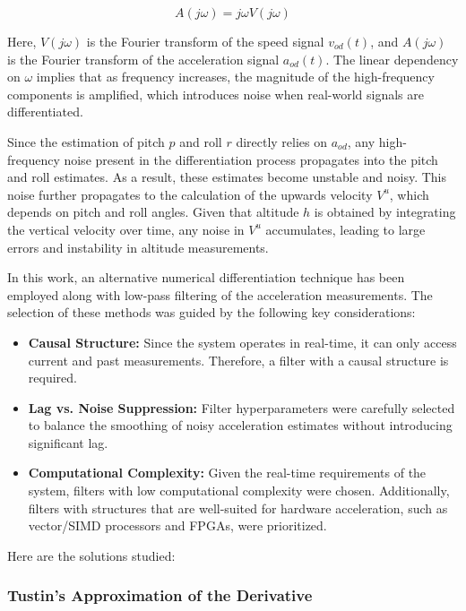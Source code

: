 \documentclass[conference]{IEEEtran}
\begin{document}
\[
A(j\omega) = j\omega V(j\omega)
\]

Here, \( V(j\omega) \) is the Fourier transform of the speed signal \( v_{od}(t) \), and \( A(j\omega) \) is the Fourier transform of the acceleration signal \( a_{od}(t) \). The linear dependency on \( \omega \) implies that as frequency increases, the magnitude of the high-frequency components is amplified, which introduces noise when real-world signals are differentiated.

Since the estimation of pitch \( p \) and roll \( r \) directly relies on \( a_{od} \), any high-frequency noise present in the differentiation process propagates into the pitch and roll estimates. As a result, these estimates become unstable and noisy. This noise further propagates to the calculation of the upwards velocity \( V^u \), which depends on pitch and roll angles. Given that altitude \( h \) is obtained by integrating the vertical velocity over time, any noise in \( V^u \) accumulates, leading to large errors and instability in altitude measurements.
 
In this work, an alternative numerical differentiation technique has been employed along with low-pass filtering of the acceleration measurements. The selection of these methods was guided by the following key considerations: 
 
\begin{itemize}
    \item \textbf{Causal Structure:} Since the system operates in real-time, it can only access current and past measurements. Therefore, a filter with a causal structure is required.
    
    \item \textbf{Lag vs. Noise Suppression:} Filter hyperparameters were carefully selected to balance the smoothing of noisy acceleration estimates without introducing significant lag.
    
    \item \textbf{Computational Complexity:} Given the real-time requirements of the system, filters with low computational complexity were chosen. Additionally, filters with structures that are well-suited for hardware acceleration, such as vector/SIMD processors and FPGAs, were prioritized.
\end{itemize}

Here are the solutions studied:

\subsubsection{\textbf{Tustin's Approximation of the Derivative}}
\end{document}
